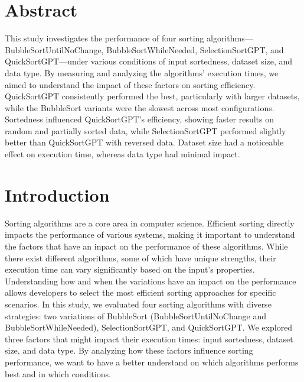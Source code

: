 \documentclass[unicode,11pt,a4paper,oneside,numbers=endperiod,openany]{scrartcl}
\begin{document}
\setassignment
{}

\newline


\section{Abstract}

This study investigates the performance of four sorting algorithms—BubbleSortUntilNoChange, BubbleSortWhileNeeded, SelectionSortGPT, and QuickSortGPT—under various conditions of input sortedness, dataset size, and data type. By measuring and analyzing the algorithms' execution times, we aimed to understand the impact of these factors on sorting efficiency. QuickSortGPT consistently performed the best, particularly with larger datasets, while the BubbleSort variants were the slowest across most configurations. Sortedness influenced QuickSortGPT's efficiency, showing faster results on random and partially sorted data, while SelectionSortGPT performed slightly better than QuickSortGPT with reversed data. Dataset size had a noticeable effect on execution time, whereas data type had minimal impact.


\section{Introduction}

Sorting algorithms are a core area in computer science. Efficient sorting directly impacts the performance of various systems, making it important to understand the factors that have an inpact on the performance of these algorithms. 
While there exist different algorithms, some of which have unique strengths, their execution time can vary significantly based on the input's properties. Understanding how and when the variations have an impact on the performance allows developers to select the most efficient sorting approaches for specific scenarios.
In this study, we evaluated four sorting algorithms with diverse strategies: two variations of BubbleSort (BubbleSortUntilNoChange and BubbleSortWhileNeeded), SelectionSortGPT, and QuickSortGPT. We explored three factors that might impact their execution times: input sortedness, dataset size, and data type. By analyzing how these factors influence sorting performance, we want to have a better understand on which algorithms performs best and in which conditions.
\end{document}

